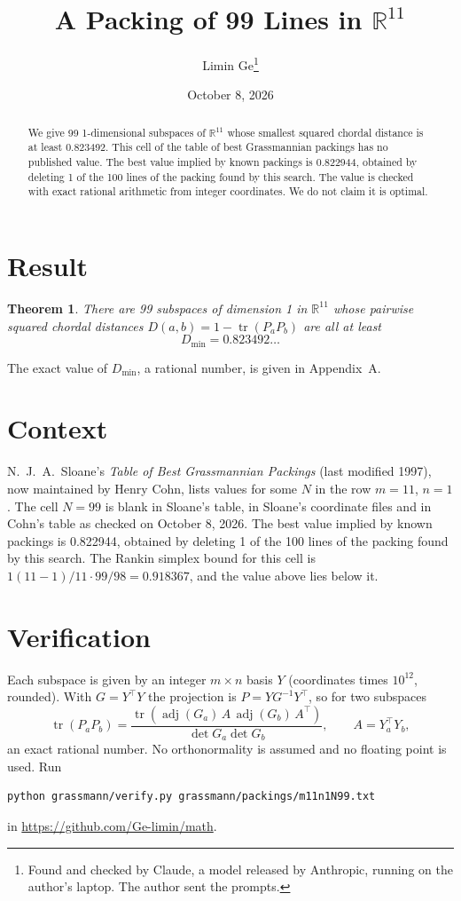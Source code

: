 \documentclass[11pt,a4paper]{article}
\title{A Packing of 99 Lines in $\mathbb{R}^{11}$}
\author{Limin Ge\thanks{Found and checked by Claude, a model released by Anthropic, running on the author's laptop. The author sent the prompts.}}
\date{October 8, 2026}
\newtheorem*{theorem}{Theorem}
\begin{document}
\maketitle
\begin{abstract}
We give 99 1-dimensional subspaces of $\mathbb{R}^{11}$ whose smallest squared chordal distance is at least 0.823492. This cell of the table of best Grassmannian packings has no published value. The best value implied by known packings is 0.822944, obtained by deleting 1 of the 100 lines of the packing found by this search. The value is checked with exact rational arithmetic from integer coordinates. We do not claim it is optimal.
\end{abstract}

\section{Result}
\begin{theorem}
There are 99 subspaces of dimension 1 in $\mathbb{R}^{11}$ whose pairwise squared chordal distances $D(a,b) = 1 - \operatorname{tr}(P_aP_b)$ are all at least
\[ D_{\min} = 0.823492\ldots \]
\end{theorem}
The exact value of $D_{\min}$, a rational number, is given in Appendix~A.


\section{Context}
N.~J.~A.~Sloane's \emph{Table of Best Grassmannian Packings} (last modified 1997), now maintained by Henry Cohn, lists values for some $N$ in the row $m=11$, $n=1$. The cell $N=99$ is blank in Sloane's table, in Sloane's coordinate files and in Cohn's table as checked on October 8, 2026. The best value implied by known packings is 0.822944, obtained by deleting 1 of the 100 lines of the packing found by this search. The Rankin simplex bound for this cell is $1(11-1)/11\cdot 99/98 = 0.918367$, and the value above lies below it.


\section{Verification}
Each subspace is given by an integer $m\times n$ basis $Y$ (coordinates times $10^{12}$, rounded). With $G=Y^\top Y$ the projection is $P=YG^{-1}Y^\top$, so for two subspaces
\[ \operatorname{tr}(P_aP_b)=\frac{\operatorname{tr}(\operatorname{adj}(G_a)\,A\,\operatorname{adj}(G_b)\,A^\top)}{\det G_a\det G_b},\qquad A=Y_a^\top Y_b, \]
an exact rational number. No orthonormality is assumed and no floating point is used. Run
\begin{verbatim}
python grassmann/verify.py grassmann/packings/m11n1N99.txt
\end{verbatim}
in \url{https://github.com/Ge-limin/math}.
\end{document}
